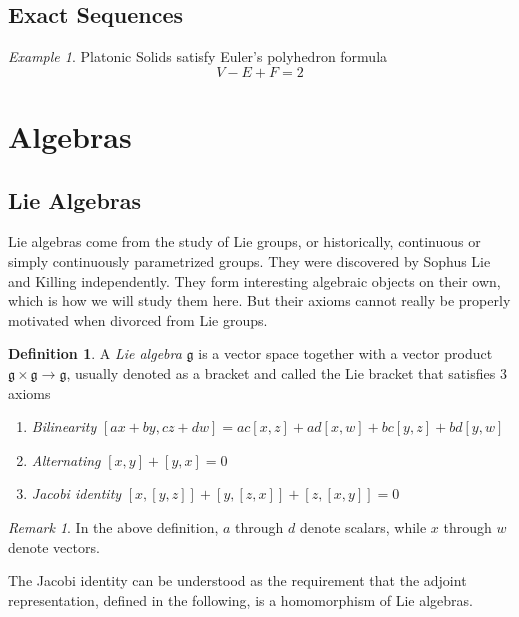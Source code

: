 \documentclass[12pt]{article}
\theoremstyle{definition}
\newtheorem{definition}{Definition}[section]
\theoremstyle{remark}
\newtheorem*{remark}{Remark}
\theoremstyle{example}
\newtheorem{example}{Example}
\theoremstyle{theorem}
\theoremstyle{lemma}
\begin{document}
\subsection{Exact Sequences}

\begin{example}
	Platonic Solids satisfy Euler's polyhedron formula
	\begin{equation}
		V - E + F = 2
	\end{equation}
\end{example}

\section{Algebras}

\subsection{Lie Algebras}

Lie algebras come from the study of Lie groups, or historically, continuous or simply continuously parametrized groups. They were discovered by Sophus Lie and Killing independently. They form interesting algebraic objects on their own, which is how we will study them here. But their axioms cannot really be properly motivated when divorced from Lie groups.

\begin{definition}
	A \textit{Lie algebra} $\mathfrak{g}$ is a vector space together with a vector product $\mathfrak{g}\times\mathfrak{g}\to\mathfrak{g}$, usually denoted as a bracket and called the Lie bracket that satisfies 3 axioms
	\begin{enumerate}
		\item \textit{Bilinearity}
		\subitem $[ax+by,cz+dw]=ac[x,z]+ad[x,w]+bc[y,z]+bd[y,w]$
		\item \textit{Alternating}
		\subitem $[x,y]+[y,x]=0$
		\item \textit{Jacobi identity}
		\subitem $[x,[y,z]]+[y,[z,x]]+[z,[x,y]]=0$
	\end{enumerate}
\end{definition}

\begin{remark}
	In the above definition, $a$ through $d$ denote scalars, while $x$ through $w$ denote vectors.
	
	The Jacobi identity can be understood as the requirement that the adjoint representation, defined in the following, is a homomorphism of Lie algebras.
\end{remark}
\end{document}
